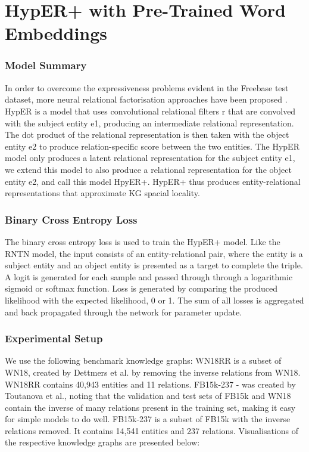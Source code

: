 
\section{HypER+ with Pre-Trained Word Embeddings}

\subsubsection{Model Summary} 
In order to overcome the expressiveness problems evident in the Freebase test dataset, more neural relational factorisation approaches have been proposed \cite{ComplEx, Neural LP, TorusE}. \newline
HypER is a model that uses convolutional relational filters r that are convolved with the subject entity e1, producing an intermediate relational representation. The dot product of the relational representation is then taken with the object entity e2 to produce relation-specific score between the two entities. The HypER model only produces a latent relational representation for the subject entity e1, we extend this model to also produce a relational representation for the object entity e2, and call this model HpyER+. HypER+ thus produces entity-relational representations that approximate KG spacial locality. \newline
\subsubsection{Binary Cross Entropy Loss}
The binary cross entropy loss \cite{reference} is used to train the HypER+ model. Like the RNTN model, the input consists of an entity-relational pair, where the entity is a subject entity and an object entity is presented as a target to complete the triple. A logit is generated for each sample and passed through through a logarithmic sigmoid or softmax function. Loss is generated by comparing the produced likelihood with the expected likelihood, 0 or 1. The sum of all losses is aggregated and back propagated through the network for parameter update. \newline

\subsubsection{Experimental Setup} 

We use the following benchmark knowledge graphs: WN18RR is a subset of WN18, created by Dettmers et al. by removing the inverse relations from WN18. WN18RR contains 40,943 entities and 11 relations. \newline
FB15k-237 - was created by Toutanova et al., noting that the validation and test sets of FB15k and WN18 contain the inverse of many relations present in the training set, making it easy for simple models to do well. FB15k-237 is a subset of FB15k with the inverse relations removed. It contains 14,541 entities and 237 relations. \newline \newline
Visualisations of the respective knowledge graphs are presented below:

